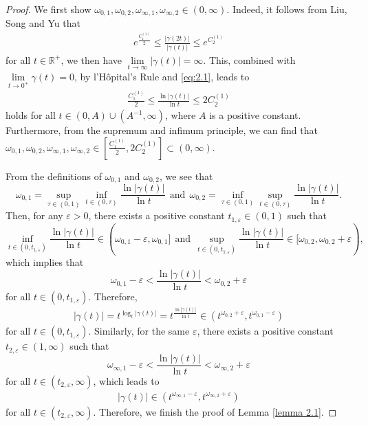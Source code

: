 \documentclass[11pt, twoside, leqno]{article}
\theoremstyle{definition}
\numberwithin{equation}{section}
\begin{document}
\begin{proof}
We first show $\omega_{0,1}, \omega_{0,2}, \omega_{\infty,1}, \omega_{\infty,2}\in (0,\infty)$. Indeed, it follows from Liu, Song and Yu \cite[Remark 1.4]{LSY} that
\begin{align}\label{eq:2.2}
e^{\frac{C^{(1)}_{1}}{2}}\leq \frac{|\gamma(2t)|}{|\gamma(t)|}\leq e^{C^{(1)}_{2}}
  \end{align}
for all $t\in \mathbb{R}^+$, we then have $\lim\limits_{t\rightarrow \infty}|\gamma(t)|=\infty$. This, combined with $\lim\limits_{t\rightarrow 0^+}\gamma(t)=0$, by l'H\^{o}pital's Rule and \eqref{eq:2.1}, leads to
\begin{align*}
\frac{C^{(1)}_1}{2}\leq{\frac{\ln{|\gamma(t)|}}{\ln t}}\leq 2C^{(1)}_2
  \end{align*}
holds for all $t\in (0, A)\cup (A^{-1}, \infty)$, where $A$ is a positive constant. Furthermore, from the supremum and infimum principle, we can find that $\omega_{0,1}, \omega_{0,2}, \omega_{\infty,1}, \omega_{\infty,2}\in [\frac{C^{(1)}_1}{2}, 2C^{(1)}_2] \subset(0,\infty)$.

From the definitions of $\omega_{0,1}$ and $\omega_{0,2}$, we see that $$\omega_{0,1}=\sup\limits_{\tau\in (0, 1)}\inf\limits_{t\in (0, \tau)}\frac{\ln|\gamma(t)|}{\ln t} ~~\textrm{and} ~~\omega_{0,2}=\inf\limits_{\tau\in (0,1)}\sup\limits_{t\in (0,\tau)}\frac{\ln|\gamma(t)|}{\ln t}.$$ Then, for any $\varepsilon>0$, there exists a positive constant $t_{1,\varepsilon}\in(0,1)$ such that $$\inf\limits_{t\in (0, t_{1,\varepsilon})}\frac{\ln|\gamma(t)|}{\ln t}\in(\omega_{0,1}-\varepsilon, \omega_{0,1}]~~ \textrm{and} ~~\sup_{t\in (0, t_{1,\varepsilon})}\frac{\ln|\gamma(t)|}{\ln t}\in [\omega_{0,2}, \omega_{0,2}+\varepsilon),$$ which implies that $$\omega_{0,1}-\varepsilon<\frac{\ln|\gamma(t)|}{\ln t}<\omega_{0,2}+\varepsilon$$ for all $t\in (0, t_{1,\varepsilon})$. Therefore,
\begin{align*}
|\gamma(t)|=t^{\log_t {|\gamma(t)|}}=t^{\frac{\ln |\gamma(t)|}{\ln t}}\in(t^{\omega_{0,2}+\varepsilon},t^{\omega_{0,1}-\varepsilon})
\end{align*}
for all $t\in (0, t_{1,\varepsilon})$. Similarly, for the same $\varepsilon$, there exists a positive constant $t_{2,\varepsilon}\in(1,\infty)$ such that $$\omega_{\infty,1}-\varepsilon<\frac{\ln|\gamma(t)|}{\ln t}<\omega_{\infty,2}+\varepsilon$$ for all $t\in (t_{2,\varepsilon}, \infty)$, which leads to
\begin{align*}
|\gamma(t)|\in(t^{\omega_{\infty,1}-\varepsilon},t^{\omega_{\infty,2}+\varepsilon})
\end{align*}
for all $t\in (t_{2,\varepsilon}, \infty)$. Therefore, we finish the proof of Lemma \ref{lemma 2.1}.
\end{proof}
\end{document}
